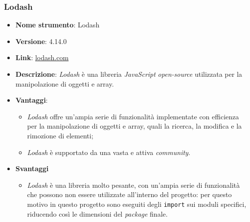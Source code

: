 \subsubsection{Lodash}
\begin{itemize}
    \item \textbf{Nome strumento}: Lodash
    \item \textbf{Versione}: 4.14.0
    \item \textbf{Link}: \href{https://lodash.com/}{lodash.com}
    \item \textbf{Descrizione}: \textit{Lodash} è una libreria \textit{JavaScript} \textit{open-source} utilizzata per la manipolazione di oggetti e array.
    \item \textbf{Vantaggi}:
          \begin{itemize}
              \item \textit{Lodash} offre un'ampia serie di funzionalità implementate con efficienza per la manipolazione di oggetti e array,
                    quali la ricerca, la modifica e la rimozione di elementi;
              \item \textit{Lodash} è supportato da una vasta e attiva \textit{community}.
          \end{itemize}
    \item \textbf{Svantaggi}
          \begin{itemize}
              \item \textit{Lodash} è una libreria molto pesante, con un'ampia serie di funzionalità che possono non essere utilizzate all'interno del progetto:
                    per questo motivo in questo progetto sono eseguiti degli \texttt{import} sui moduli specifici, riducendo così le dimensioni del \textit{\gls{package}\glox} finale.
          \end{itemize}
\end{itemize}

